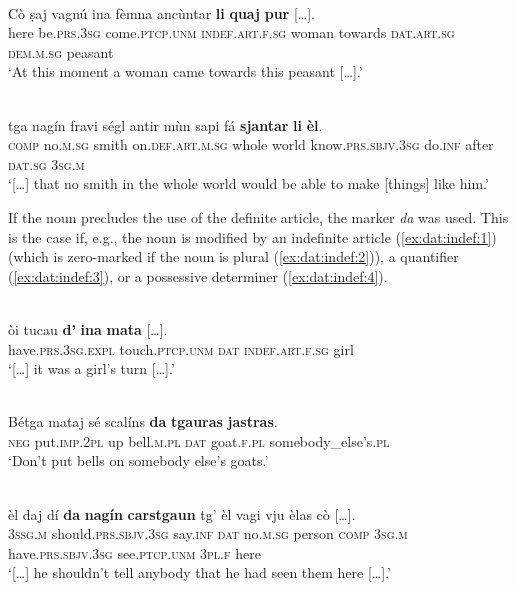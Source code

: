 \ea
{} {\citealt[64]{Büchli1966}}\\
\gll  Cò ṣaj vagnú ina	fèmna ancùntar \textbf{li} \textbf{quaj} \textbf{pur} […].\\
here be.\textsc{prs}.3\textsc{sg}  come.\textsc{ptcp.unm}	\textsc{indef}.\textsc{art}.\textsc{f}.\textsc{sg} woman towards	\textsc{dat}.\textsc{art}.\textsc{sg} \textsc{dem.m.sg} peasant\\
\glt `At this moment a woman came towards this peasant […].'
\z

\ea
{}\\
\gll   […] tga nagín fravi ségl antir mùn sapi fá \textbf{sjantar} \textbf{li} \textbf{èl}. \\
{}  \textsc{comp} no.\textsc{m.sg} smith on.\textsc{def.art.m.sg} whole world know.\textsc{prs.sbjv.3sg} do.\textsc{inf} after \textsc{dat.sg} \textsc{3sg.m}\\
\glt `[…] that no smith in the whole world would be able to make [things] like him.'
\z

If the noun precludes the use of the definite article, the marker \textit{da} was used. This is the case if, e.g., the noun is modified by an indefinite article (\ref{ex:dat:indef:1}) (which is zero-marked if the noun is plural (\ref{ex:dat:indef:2})), a quantifier (\ref{ex:dat:indef:3}), or a possessive determiner (\ref{ex:dat:indef:4}).

\ea\label{ex:dat:indef:1}
\\
\gll […] òi tucau \textbf{d'} \textbf{ina} \textbf{mata} […].\\
{} have.\textsc{prs.3sg.expl} touch.\textsc{ptcp.unm} \textsc{dat} \textsc{indef.art.f.sg} girl \\
\glt `[…] it was a girl's turn […].'
\z

\ea\label{ex:dat:indef:2}
\\
\gll Bétga mataj sé scalíns \textbf{da} \textbf{tgauras} \textbf{jastras}.\\
\textsc{neg} put.\textsc{imp.2pl} up bell.\textsc{m.pl} \textsc{dat} goat.\textsc{f.pl} somebody\_else’s.\textsc{pl}\\
\glt `Don’t put bells on somebody else’s goats.'
\z

\ea\label{ex:dat:indef:3}
\\
\gll […] èl daj dí \textbf{da} \textbf{nagín} \textbf{carstgaun} tg’ èl vagi vju èlas cò […].\\
{} \textsc{3ssg.m} should.\textsc{prs.sbjv.3sg} say.\textsc{inf} \textsc{dat} no.\textsc{m.sg} person \textsc{comp} \textsc{3sg.m} have.\textsc{prs.sbjv.3sg} see.\textsc{ptcp.unm} \textsc{3pl.f} here\\
\glt `[…] he shouldn’t tell anybody that he had seen them here […].'
\z

